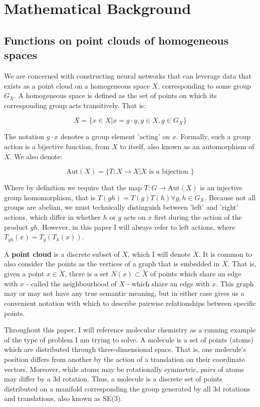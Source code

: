 \documentclass[11pt]{article}
\begin{document}
\section{Mathematical Background}
\subsection*{Functions on point clouds of homogeneous spaces}

We are concerned with constructing neural networks that can leverage data that exists as a point cloud on a homogeneous space $X$, corresponding to some group $G_X$. A homogeneous space is defined as the set of points on which its corresponding group acts transitively. That is: 

$$ X = \{x \in X | x = g \cdot y, y \in X, g \in G_X \} $$

The notation $g \cdot x$ denotes a group element 'acting' on $x$. Formally, such a group action is a bijective function, from $X$ to itself, also known as an automorphism of $X$. We also denote:

$$ \text{Aut}(X) = \{T: X \rightarrow X | X \text{ is a bijection } \}$$

Where by definition we require that the map $T: G \rightarrow \text{Aut}(X)$ is an injective group homomorphism, that is $T(gh)=T(g)T(h) \forall g, h \in G_X$. Because not all groups are abelian, we must technically distinguish between 'left' and 'right' actions, which differ in whether $h$ or $g$ acts on $x$ first during the action of the product $gh$. However, in this paper I will always refer to left actions, where $T_{gh} (x) = T_g (T_h (x))$.

A \textbf{point cloud} is a discrete subset of $X$, which I will denote $\tilde{X}$. It is common to also consider the points as the vertices of a graph that is embedded in $X$. That is, given a point $x \in  \tilde{X}$, there is a set $N(x) \subset \tilde{X}$ of points which share an edge with $x$ - called the neighbourhood of $X$ - which share an edge with $x$. This graph may or may not have any true semantic meaning, but in either case gives us a convenient notation with which to describe pairwise relationships between specific points.

Throughout this paper, I will reference molecular chemistry as a running example of the type of problem I am trying to solve. A molecule is a set of points (atoms) which are distributed through three-dimensional space. That is, one molecule's position differs from another by the action of a translation on their coordinate vectors. Moreover, while atoms may be rotationally symmetric, \textit{pairs} of atoms may differ by a 3d rotation. Thus, a molecule is a discrete set of points distributed on a manifold corresponding the group generated by all 3d rotations and translations, also known as SE(3).   
\end{document}
